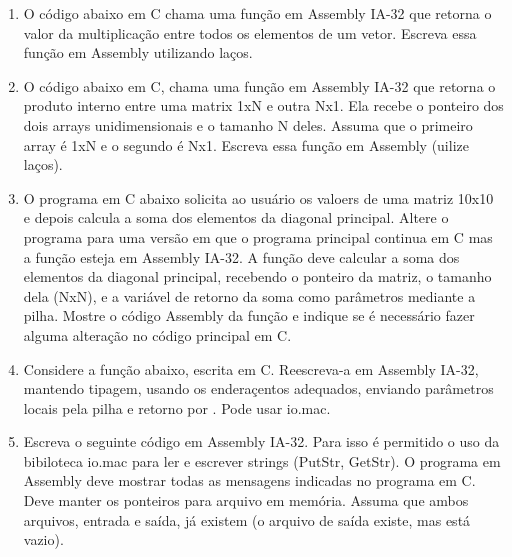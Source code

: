 \begin{enumerate}
    \begin{itemize}
        \item [(a)] 
        \item [(b)] 
        \item [(c)] 
        \item [(d)] 
    \end{itemize}

    \item   
    O código abaixo em C chama uma função em Assembly IA-32 que
    retorna o valor da multiplicação entre todos os elementos de um vetor.
    Escreva essa função em Assembly utilizando laços.

    \item
    O código abaixo em C, chama uma função em Assembly IA-32 que 
    retorna o produto interno entre uma matrix 1xN e outra Nx1.
    Ela recebe o ponteiro dos dois arrays unidimensionais e o tamanho N deles.
    Assuma que o primeiro array é 1xN e o segundo é Nx1.
    Escreva essa função em Assembly (uilize laços).

    \item
    O programa em C abaixo solicita ao usuário os valoers de uma matriz 10x10
    e depois calcula a soma dos elementos da diagonal principal.
    Altere o programa para uma versão em que o programa principal continua em C
    mas a função  esteja em Assembly IA-32.
    A função deve calcular a soma dos elementos da diagonal principal,
    recebendo o ponteiro da matriz, o tamanho dela (NxN),
    e a variável de retorno da soma como parâmetros mediante a pilha.
    Mostre o código Assembly da função 
    e indique se é necessário fazer alguma alteração no código principal em C. 

    \item
    Considere a função  abaixo, escrita em C.
    Reescreva-a em Assembly IA-32, mantendo tipagem, 
    usando os enderaçentos adequados,
    enviando parâmetros locais pela pilha
    e retorno por .
    Pode usar io.mac.

    \item
    Escreva o seguinte código em Assembly IA-32.
    Para isso é permitido o uso da bibiloteca io.mac
    para ler e escrever strings (PutStr, GetStr).
    O programa em Assembly deve mostrar 
    todas as mensagens indicadas no programa em C.
    Deve manter os ponteiros para arquivo em memória.
    Assuma que ambos arquivos, entrada e saída, já existem 
    (o arquivo de saída existe, mas está vazio).


\end{enumerate}

